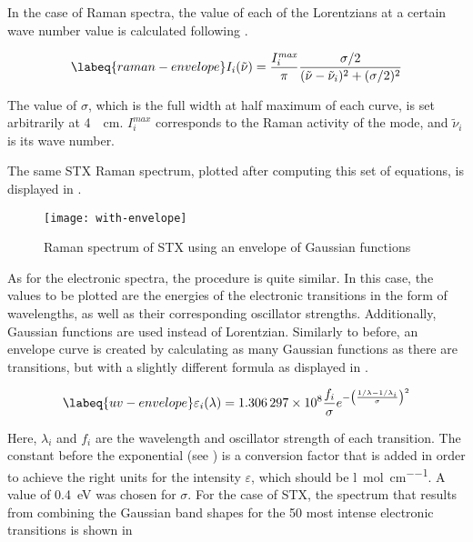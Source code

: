 In the case of Raman spectra, the value of each of the Lorentzians at a certain wave number value is calculated following .

\begin{equation}
    \labeq{raman-envelope}
    I_i (\tilde{\nu}) = \frac{I_i^\textit{max}}{\pi}\frac{\sigma /2}{(\tilde{\nu} - \tilde{\nu}_i)^2+(\sigma/2)^2}
\end{equation}

The value of $\sigma$, which is the full width at half maximum of each curve, is set arbitrarily at \SI{4}{\per\cm}. $I_i^\textit{max}$ corresponds to the Raman activity of the mode, and $\tilde{\nu}_i$ is its wave number.

The same STX Raman spectrum, plotted after computing this set of equations, is displayed in .

\begin{figure}
    \centering
    \texttt{[image: with-envelope]}
    \caption[Raman spectrum with Gaussian envelope]{Raman spectrum of STX using an envelope of Gaussian functions}
\end{figure}

As for the electronic spectra, the procedure is quite similar.
In this case, the values to be plotted are the energies of the electronic transitions in the form of wavelengths, as well as their corresponding oscillator strengths.
Additionally, Gaussian functions are used instead of Lorentzian.
Similarly to before, an envelope curve is created by calculating as many Gaussian functions as there are transitions, but with a slightly different formula as displayed in .

\begin{equation}
    \labeq{uv-envelope}
    \varepsilon_i (\lambda) = \num{1.306297e8} \frac{f_i}{\sigma} e^{-\left(\frac{1/\lambda - 1/\lambda_i}{\sigma}\right)^2}
\end{equation}

Here, $\lambda_i$ and $f_i$ are the wavelength and oscillator strength of each transition. The constant before the exponential (see ) is a conversion factor that is added in order to achieve the right units for the intensity $\varepsilon$, which should be \si{\litre\per\mole\per\cm}.
A value of \SI{0.4}{\eV} was chosen for $\sigma$.
For the case of STX, the spectrum that results from combining the Gaussian band shapes for the 50 most intense electronic transitions is shown in 

